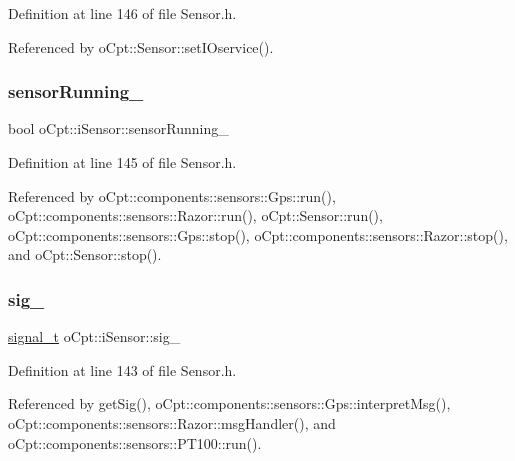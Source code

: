 Definition at line 146 of file Sensor.\+h.



Referenced by o\+Cpt\+::\+Sensor\+::set\+I\+Oservice().

\hypertarget{classo_cpt_1_1i_sensor_acc8826907fbe0c20c38a1e478e6a7c05}{}\label{classo_cpt_1_1i_sensor_acc8826907fbe0c20c38a1e478e6a7c05} 
\subsubsection{\texorpdfstring{sensor\+Running\+\_\+}{sensorRunning\_}}
{\footnotesize\ttfamily bool o\+Cpt\+::i\+Sensor\+::sensor\+Running\+\_\+\hspace{0.3cm}{\ttfamily [protected]}}



Definition at line 145 of file Sensor.\+h.



Referenced by o\+Cpt\+::components\+::sensors\+::\+Gps\+::run(), o\+Cpt\+::components\+::sensors\+::\+Razor\+::run(), o\+Cpt\+::\+Sensor\+::run(), o\+Cpt\+::components\+::sensors\+::\+Gps\+::stop(), o\+Cpt\+::components\+::sensors\+::\+Razor\+::stop(), and o\+Cpt\+::\+Sensor\+::stop().

\hypertarget{classo_cpt_1_1i_sensor_a4f4943cf2af0b1a06bf5f0d8c46d1cb8}{}\label{classo_cpt_1_1i_sensor_a4f4943cf2af0b1a06bf5f0d8c46d1cb8} 
\subsubsection{\texorpdfstring{sig\+\_\+}{sig\_}}
{\footnotesize\ttfamily \hyperlink{classo_cpt_1_1i_sensor_a2e6d170acbc05f0b557bb68671813f6d}{signal\+\_\+t} o\+Cpt\+::i\+Sensor\+::sig\+\_\+\hspace{0.3cm}{\ttfamily [protected]}}



Definition at line 143 of file Sensor.\+h.



Referenced by get\+Sig(), o\+Cpt\+::components\+::sensors\+::\+Gps\+::interpret\+Msg(), o\+Cpt\+::components\+::sensors\+::\+Razor\+::msg\+Handler(), and o\+Cpt\+::components\+::sensors\+::\+P\+T100\+::run().

